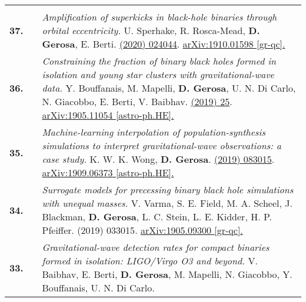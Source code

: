 {\begin{longtable}{rp{0.3cm}p{15.8cm}}
\vspace{0.09cm}\\
%
\textbf{37.} & & \textit{Amplification of superkicks in black-hole binaries through orbital eccentricity.}
\newline{}
U. Sperhake, R. Rosca-Mead, \textbf{D. Gerosa}, E. Berti.
\newline{}
\href{https://journals.aps.org/prd/abstract/10.1103/PhysRevD.101.024044}{\prd 101 (2020) 024044}. \href{https://arxiv.org/abs/1910.01598}{arXiv:1910.01598 [gr-qc].}
\vspace{0.09cm}\\
%
\textbf{36.} & & \textit{Constraining the fraction of binary black holes formed in isolation and young star clusters with gravitational-wave data.}
\newline{}
Y. Bouffanais, M. Mapelli, \textbf{D. Gerosa}, U. N. Di Carlo, N. Giacobbo, E. Berti, V. Baibhav.
\newline{}
\href{https://iopscience.iop.org/article/10.3847/1538-4357/ab4a79}{\apj 886 (2019) 25}. \href{https://arxiv.org/abs/1905.11054}{arXiv:1905.11054 [astro-ph.HE].}
\vspace{0.09cm}\\
%
\textbf{35.} & & \textit{Machine-learning interpolation of population-synthesis simulations to interpret gravitational-wave observations: a case study.}
\newline{}
K. W. K. Wong, \textbf{D. Gerosa}.
\newline{}
\href{https://journals.aps.org/prd/abstract/10.1103/PhysRevD.100.083015}{\prd 100 (2019) 083015}. \href{https://arxiv.org/abs/1909.06373}{arXiv:1909.06373 [astro-ph.HE].}
\vspace{0.09cm}\\
%
\textbf{34.} & & \textit{Surrogate models for precessing binary black hole simulations with unequal masses.}
\newline{}
V. Varma, S. E. Field, M. A. Scheel, J. Blackman, \textbf{D. Gerosa}, L. C. Stein, L. E. Kidder, H. P. Pfeiffer.
\newline{}
{\prr 1 (2019) 033015}. \href{https://arxiv.org/abs/1905.09300}{arXiv:1905.09300 [gr-qc].}
\vspace{0.09cm}\\
%
\textbf{33.} & & \textit{Gravitational-wave detection rates for compact binaries formed in isolation: LIGO/Virgo O3 and beyond.}
\newline{}
V. Baibhav, E. Berti, \textbf{D. Gerosa}, M. Mapelli, N. Giacobbo, Y. Bouffanais, U. N. Di Carlo.
\newline{}

\end{longtable}}
